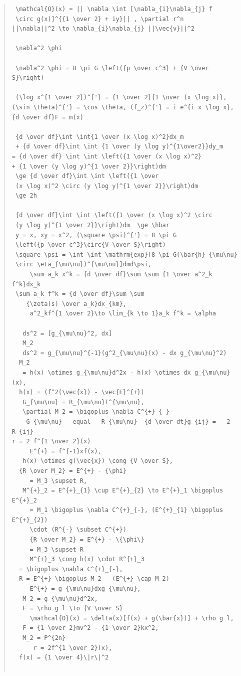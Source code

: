 \documentclass{jsarticle}
\begin{document}
\begin{quote}
\begin{verbatim}
 \mathcal{O}(x) = || \nabla \int [\nabla_{i}\nabla_{j} f 
 \circ g(x)]^{{1 \over 2} + iy}|| , \partial r^n 
||\nabla||^2 \to \nabla_{i}\nabla_{j} ||\vec{v}||^2 

 \nabla^2 \phi 

 \nabla^2 \phi = 8 \pi G \left({p \over c^3} + {V \over S}\right) 

 (\log x^{1 \over 2})^{'} = {1 \over 2}{1 \over (x \log x)},
(\sin \theta)^{'} = \cos \theta, (f_z)^{'} = i e^{i x \log x}, 
{d \over df}F = m(x) 

 {d \over df}\int \int{1 \over (x \log x)^2}dx_m 
 + {d \over df}\int \int {1 \over (y \log y)^{1\over2}}dy_m
= {d \over df} \int \int \left({1 \over (x \log x)^2} 
+ {1 \over (y \log y)^{1 \over 2}}\right)dm  
 \ge {d \over df}\int \int \left({1 \over 
 (x \log x)^2 \circ (y \log y)^{1 \over 2}}\right)dm 
 \ge 2h

 {d \over df}\int \int \left({1 \over (x \log x)^2 \circ 
 (y \log y)^{1 \over 2}}\right)dm  \ge \hbar 
 y = x, xy = x^2, (\square \psi)^{'} = 8 \pi G
 \left({p \over c^3}\circ{V \over S}\right) 
 \square \psi = \int \int \mathrm{exp}[8 \pi G(\bar{h}_{\mu\nu}
 \circ \eta_{\mu\nu})^{\mu\nu}]dmd\psi,
	 \sum a_k x^k = {d \over df}\sum \sum {1 \over a^2_k f^k}dx_k
 \sum a_k f^k = {d \over df}\sum \sum
	{\zeta(s) \over a_k}dx_{km}, 
	 a^2_kf^{1 \over 2}\to \lim_{k \to 1}a_k f^k = \alpha 

   ds^2 = [g_{\mu\nu}^2, dx] 
   M_2 
   ds^2 = g_{\mu\nu}^{-1}(g^2_{\mu\nu}(x) - dx g_{\mu\nu}^2) 
  M_2  
   = h(x) \otimes g_{\mu\nu}d^2x - h(x) \otimes dx g_{\mu\nu}(x),
  h(x) = (f^2(\vec{x}) - \vec{E}^{+}) 
   G_{\mu\nu} = R_{\mu\nu}T^{\mu\nu},
   \partial M_2 = \bigoplus \nabla C^{+}_{-}   
    G_{\mu\nu}   equal   R_{\mu\nu}  {d \over dt}g_{ij} = - 2 R_{ij} 
r = 2 f^{1 \over 2}(x)
     E^{+} = f^{-1}xf(x), 
   h(x) \otimes g(\vec{x}) \cong {V \over S},
  {R \over M_2} = E^{+} - {\phi}   
     = M_3 \supset R,
   M^{+}_2 = E^{+}_{1} \cup E^{+}_{2} \to E^{+}_1 \bigoplus E^{+}_2   
     = M_1 \bigoplus \nabla C^{+}_{-}, (E^{+}_{1} \bigoplus E^{+}_{2}) 
     \cdot (R^{-} \subset C^{+})   
     {R \over M_2} = E^{+} - \{\phi\}   
     = M_3 \supset R   
     M^{+}_3 \cong h(x) \cdot R^{+}_3
  = \bigoplus \nabla C^{+}_{-}, 
  R = E^{+} \bigoplus M_2 - (E^{+} \cap M_2)   
     E^{+} = g_{\mu\nu}dxg_{\mu\nu},
   M_2 = g_{\mu\nu}d^2x,
   F = \rho g l \to {V \over S}   
     \mathcal{O}(x) = \delta(x)[f(x) + g(\bar{x})] + \rho g l,
   F = {1 \over 2}mv^2 - {1 \over 2}kx^2,
   M_2 = P^{2n}   
      r = 2f^{1 \over 2}(x),
  f(x) = {1 \over 4}\|r\|^2   


\end{verbatim}
\end{quote}
\end{document}

